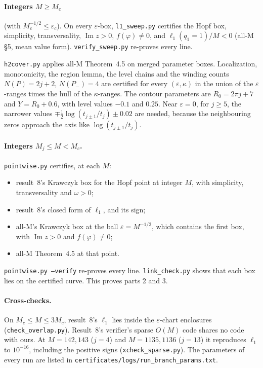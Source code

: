 \documentclass[11pt,a4paper]{report}
\begin{document}
\paragraph{Integers \(M\ge M_c\)} (with \(M_c^{-1/2}\le\varepsilon_c\)). On every \(\varepsilon\)-box,
\texttt{l1\_sweep.py} certifies the Hopf box, simplicity, transversality, \(\operatorname{Im}z>0\), \(f(\varphi)\ne0\),
and \(\ell_1(q_1=1)/M<0\) (all-M §5, mean value form). \texttt{verify\_sweep.py} re-proves every line.

\texttt{h2cover.py} applies all-M Theorem~4.5 on merged parameter boxes. Localization, monotonicity, the region lemma,
the level chains and the winding counts \(N(P)=2j+2\), \(N(P_-)=4\) are certified for every \((\varepsilon,\kappa)\) in
the union of the \(\varepsilon\)-ranges times the hull of the \(\kappa\)-ranges. The contour parameters are
\(R_0=2\pi j+7\) and \(Y=R_0+0.6\), with level values \(-0.1\) and \(0.25\). Near \(\varepsilon=0\), for \(j\ge5\), the
narrower values \(\mp\frac12\log(t_{j\pm1}/t_j)\pm0.02\) are needed, because the neighbouring zeros approach the axis
like \(\log(t_{j\pm1}/t_j)\).

\paragraph{Integers \(M_j\le M<M_c\).} \texttt{pointwise.py} certifies, at each \(M\):
\begin{itemize}
\item result~8's Krawczyk box for the Hopf point at integer \(M\), with simplicity, transversality and \(\omega>0\);
\item result~8's closed form of \(\ell_1\), and its sign;
\item all-M's Krawczyk box at the ball \(\varepsilon=M^{-1/2}\), which contains the first box, with
\(\operatorname{Im}z>0\) and \(f(\varphi)\ne0\);
\item all-M Theorem~4.5 at that point.
\end{itemize}
\texttt{pointwise.py --verify} re-proves every line. \texttt{link\_check.py} shows that each box lies on the certified
curve. This proves parts 2 and 3.

\paragraph{Cross-checks.} On \(M_c\le M\le3M_c\), result~8's \(\ell_1\) lies inside the \(\varepsilon\)-chart enclosures
(\texttt{check\_overlap.py}). Result~8's verifier's sparse \(O(M)\) code shares no code with ours. At \(M=142,143\)
(\(j=4\)) and \(M=1135,1136\) (\(j=13\)) it reproduces \(\ell_1\) to \(10^{-16}\), including the positive signs
(\texttt{xcheck\_sparse.py}). The parameters of every run are listed in
\texttt{certificates/logs/run\_branch\_params.txt}.
\end{document}
